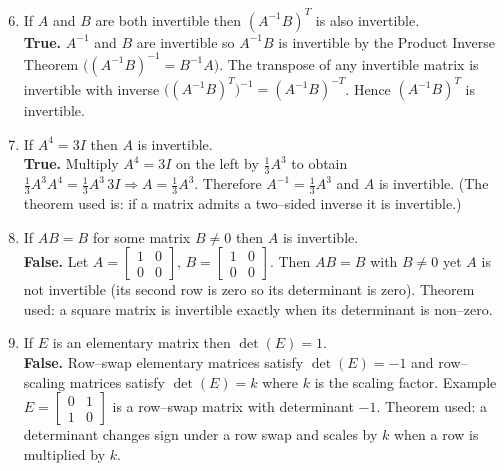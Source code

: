 \documentclass{article}
\begin{document}
\begin{multicols*}{2}
\begin{enumerate}[label=(\alph*)]
\setcounter{enumi}{5}

\item If $A$ and $B$ are both invertible then $(A^{-1}B)^{T}$ is also invertible.\\
\textbf{True.}  
$A^{-1}$ and $B$ are invertible so $A^{-1}B$ is invertible by the Product Inverse Theorem  
$\bigl((A^{-1}B)^{-1}=B^{-1}A\bigr)$.  
The transpose of any invertible matrix is invertible with inverse $\bigl((A^{-1}B)^{T}\bigr)^{-1}=(A^{-1}B)^{-T}$.  
Hence $(A^{-1}B)^{T}$ is invertible.

\item If $A^{4}=3I$ then $A$ is invertible.\\
\textbf{True.}  
Multiply $A^{4}=3I$ on the left by $\tfrac{1}{3}A^{3}$ to obtain  
$\tfrac{1}{3}A^{3}A^{4}=\tfrac{1}{3}A^{3}\,3I \Longrightarrow A=\tfrac{1}{3}A^{3}$.  
Therefore $A^{-1}=\tfrac{1}{3}A^{3}$ and $A$ is invertible.  
(The theorem used is: if a matrix admits a two–sided inverse it is invertible.)

\item If $AB=B$ for some matrix $B\neq 0$ then $A$ is invertible.\\
\textbf{False.}  
Let 
$
A=\begin{bmatrix}1&0\\0&0\end{bmatrix},\,
B=\begin{bmatrix}1&0\\0&0\end{bmatrix}.
$  
Then $AB=B$ with $B\neq 0$ yet $A$ is not invertible (its second row is zero so its determinant is zero).  
Theorem used: a square matrix is invertible exactly when its determinant is non–zero.

\item If $E$ is an elementary matrix then $\det(E)=1$.\\
\textbf{False.}  
Row–swap elementary matrices satisfy $\det(E)=-1$ and row–scaling matrices satisfy $\det(E)=k$ where $k$ is the scaling factor.  
Example  
$
E=\begin{bmatrix}0&1\\1&0\end{bmatrix}
$  
is a row–swap matrix with determinant $-1$.  
Theorem used: a determinant changes sign under a row swap and scales by $k$ when a row is multiplied by $k$.


\end{enumerate}
\end{multicols*}
\end{document}
